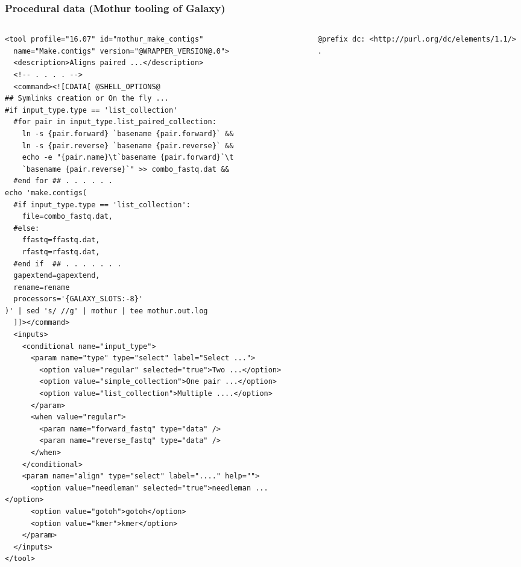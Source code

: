 \documentclass[10pt]{beamer}
\begin{document}
\begin{frame}[fragile]
  \frametitle{Procedural data (Mothur tooling of Galaxy)}
  \begin{columns}[T]
    \begin{column}{0.5\linewidth}
\begin{verbatim}
<tool profile="16.07" id="mothur_make_contigs"
  name="Make.contigs" version="@WRAPPER_VERSION@.0">
  <description>Aligns paired ...</description>
  <!-- . . . . -->
  <command><![CDATA[ @SHELL_OPTIONS@
## Symlinks creation or On the fly ...
#if input_type.type == 'list_collection'
  #for pair in input_type.list_paired_collection:
    ln -s {pair.forward} `basename {pair.forward}` &&
    ln -s {pair.reverse} `basename {pair.reverse}` &&
    echo -e "{pair.name}\t`basename {pair.forward}`\t
    `basename {pair.reverse}`" >> combo_fastq.dat &&
  #end for ## . . . . . .
echo 'make.contigs(
  #if input_type.type == 'list_collection':
    file=combo_fastq.dat,
  #else:
    ffastq=ffastq.dat,
    rfastq=rfastq.dat,
  #end if  ## . . . . . . .
  gapextend=gapextend,
  rename=rename
  processors='{GALAXY_SLOTS:-8}'
)' | sed 's/ //g' | mothur | tee mothur.out.log
  ]]></command>
  <inputs>
    <conditional name="input_type">
      <param name="type" type="select" label="Select ...">
        <option value="regular" selected="true">Two ...</option>
        <option value="simple_collection">One pair ...</option>
        <option value="list_collection">Multiple ....</option>
      </param>
      <when value="regular">
        <param name="forward_fastq" type="data" />
        <param name="reverse_fastq" type="data" />
      </when>
    </conditional>
    <param name="align" type="select" label="...." help="">
      <option value="needleman" selected="true">needleman ...</option>
      <option value="gotoh">gotoh</option>
      <option value="kmer">kmer</option>
    </param>
  </inputs>
</tool>
\end{verbatim}
    \end{column}
    \begin{column}{0.5\linewidth}
\begin{verbatim}
@prefix dc: <http://purl.org/dc/elements/1.1/> .


\end{verbatim}
\end{column}
\end{columns}
\end{frame}
\end{document}
